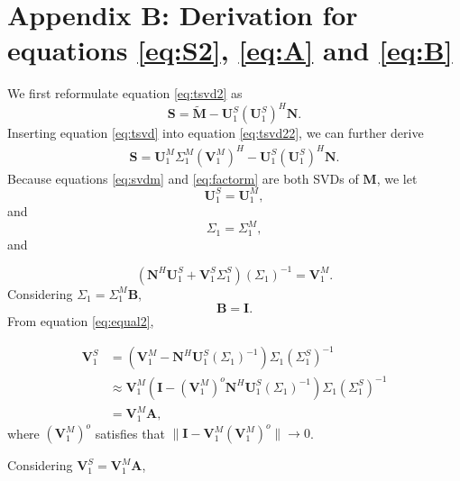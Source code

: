 \section{Appendix B: Derivation for equations \ref{eq:S2}, \ref{eq:A} and \ref{eq:B}}
We first reformulate equation \ref{eq:tsvd2} as
\begin{equation}
\label{eq:tsvd22}
\mathbf{S} = \tilde{\mathbf{M}} -\mathbf{U}_1^S(\mathbf{U}_1^S)^H\mathbf{N}.
\end{equation}
Inserting equation \ref{eq:tsvd} into equation \ref{eq:tsvd22}, we can further derive 
\begin{equation}
\label{eq:tsvd222}
\begin{split}
\mathbf{S} = \mathbf{U}_1^M\Sigma_1^M(\mathbf{V}_1^M)^H -\mathbf{U}_1^S(\mathbf{U}_1^S)^H\mathbf{N}.
\end{split}
\end{equation}
Because equations \ref{eq:svdm} and \ref{eq:factorm} are both SVDs of $\mathbf{M}$, we let
\begin{equation}
\label{eq:equal1}
\mathbf{U}_1^S=\mathbf{U}_1^M,
\end{equation}
and
\begin{equation}
\label{eq:equal3}
\Sigma_1=\Sigma_1^M,
\end{equation}
and

\begin{equation}
\label{eq:equal2}
(\mathbf{N}^H\mathbf{U}_1^S+\mathbf{V}_1^S\Sigma_1^S)(\Sigma_1)^{-1}=\mathbf{V}_1^M.
\end{equation}
Considering $\Sigma_1= \Sigma_1^M\mathbf{B}$,
\begin{equation}
\label{eq:Bder}
\mathbf{B}=\mathbf{I}.
\end{equation}
From equation \ref{eq:equal2},

\begin{equation}
\label{eq:Ader0}
\begin{split}
\mathbf{V}_1^S&=(\mathbf{V}_1^M-\mathbf{N}^H\mathbf{U}_1^S(\Sigma_1)^{-1})\Sigma_1(\Sigma_1^S)^{-1}\\
&\approx \mathbf{V}_1^M(\mathbf{I}-(\mathbf{V}_1^M)^{o}\mathbf{N}^H\mathbf{U}_1^S(\Sigma_1)^{-1})\Sigma_1(\Sigma_1^S)^{-1}\\
&=\mathbf{V}_1^M\mathbf{A},
\end{split}
\end{equation}
where $(\mathbf{V}_1^M)^{o}$ satisfies that $\parallel\mathbf{I}-\mathbf{V}_1^M(\mathbf{V}_1^M)^{o} \parallel\rightarrow 0$.

Considering $\mathbf{V}_1^S=\mathbf{V}_1^M\mathbf{A}$,

